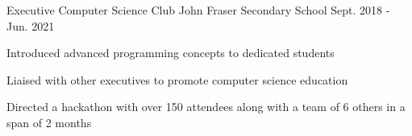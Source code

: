 

\begin{cventries}

  \cventry
    {Executive} %
    {Computer Science Club} %
    {John Fraser Secondary School} %
    {Sept. 2018 - Jun. 2021} %
    {
      \begin{cvitems} %
		\item {Introduced advanced programming concepts to dedicated students}
		\item {Liaised with other executives to promote computer science education}
		\item {Directed a hackathon with over 150 attendees along with a team of 6 others in a span of 2 months}
      \end{cvitems}
    }


\end{cventries}
